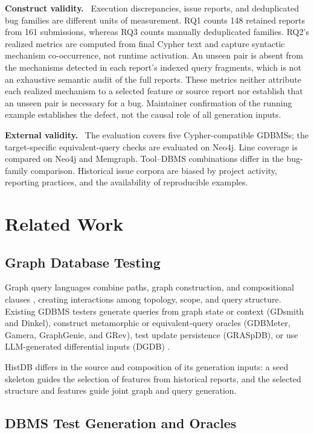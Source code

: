 \documentclass[acmsmall,screen,anonymous]{acmart}
\newcommand{\cnpara}[1]{\par\noindent\textbf{#1.}\ }
\begin{document}
\cnpara{Construct validity}
Execution discrepancies, issue reports, and deduplicated bug families are different units of measurement. RQ1 counts 148 retained reports from 161 submissions, whereas RQ3 counts manually deduplicated families. RQ2's realized metrics are computed from final Cypher text and capture syntactic mechanism co-occurrence, not runtime activation. An unseen pair is absent from the mechanisms detected in each report's indexed query fragments, which is not an exhaustive semantic audit of the full reports. These metrics neither attribute each realized mechanism to a selected feature or source report nor establish that an unseen pair is necessary for a bug. Maintainer confirmation of the running example establishes the defect, not the causal role of all generation inputs.

\cnpara{External validity}
The evaluation covers five Cypher-compatible GDBMSs; the target-specific equivalent-query checks are evaluated on Neo4j. Line coverage is compared on Neo4j and Memgraph. Tool--DBMS combinations differ in the bug-family comparison. Historical issue corpora are biased by project activity, reporting practices, and the availability of reproducible examples.

\section{Related Work}

\subsection{Graph Database Testing}

Graph query languages combine paths, graph construction, and compositional clauses \cite{ref30,ref31,ref32}, creating interactions among topology, scope, and query structure. Existing GDBMS testers generate queries from graph state or context (GDsmith and Dinkel), construct metamorphic or equivalent-query oracles (GDBMeter, Gamera, GraphGenie, and GRev), test update persistence (GRASpDB), or use LLM-generated differential inputs (DGDB) \cite{ref3,ref7,ref4,ref5,ref6,refGRev,ref17,ref8}.

HistDB differs in the source and composition of its generation inputs: a seed skeleton guides the selection of features from historical reports, and the selected structure and features guide joint graph and query generation.

\subsection{DBMS Test Generation and Oracles}
\end{document}
